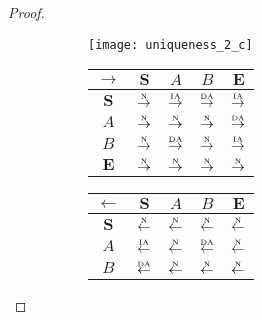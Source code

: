 \begin{proof}
\begin{figure}[htbp]
  \begin{subfigure}{1\textwidth}
    \vspace{1em}
    \centering
    \begin{minipage}[b]{1\textwidth}
      \centering
      \texttt{[image: uniqueness\_2\_c]}
    \end{minipage}
    \begin{minipage}[b]{0.3\textwidth}
      \vspace{1em}
      \centering
      \begin{tabular}{|c|c|c|c|c|} \hline
        $\rightarrow$ & $\bm{S}$ & $A$ & $B$ & $\bm{E}$\\ \hline
        $\bm{S}$ & $\overset{\text{\tiny{N}}}{\rightarrow}$ & $\overset{\text{\tiny{IA}}}{\rightarrow}$ & $\overset{\text{\tiny{DA}}}{\rightarrow}$ & $\overset{\text{\tiny{IA}}}{\rightarrow}$\\ \hline
        $A$ & $\overset{\text{\tiny{N}}}{\rightarrow}$ & $\overset{\text{\tiny{N}}}{\rightarrow}$ & $\overset{\text{\tiny{N}}}{\rightarrow}$ & $\overset{\text{\tiny{DA}}}{\rightarrow}$\\ \hline
        $B$ & $\overset{\text{\tiny{N}}}{\rightarrow}$ & $\overset{\text{\tiny{DA}}}{\rightarrow}$ & $\overset{\text{\tiny{N}}}{\rightarrow}$ & $\overset{\text{\tiny{IA}}}{\rightarrow}$\\ \hline
        $\bm{E}$ & $\overset{\text{\tiny{N}}}{\rightarrow}$ & $\overset{\text{\tiny{N}}}{\rightarrow}$ & $\overset{\text{\tiny{N}}}{\rightarrow}$ & $\overset{\text{\tiny{N}}}{\rightarrow}$\\ \hline
      \end{tabular}
    \end{minipage}
    \begin{minipage}[b]{0.3\textwidth}
      \vspace{1em}
      \centering
      \begin{tabular}{|c|c|c|c|c|} \hline
        $\leftarrow$ & $\bm{S}$ & $A$ & $B$ & $\bm{E}$\\ \hline
        $\bm{S}$ & $\overset{\text{\tiny{N}}}{\leftarrow}$ & $\overset{\text{\tiny{N}}}{\leftarrow}$ & $\overset{\text{\tiny{N}}}{\leftarrow}$ & $\overset{\text{\tiny{N}}}{\leftarrow}$\\ \hline
        $A$ & $\overset{\text{\tiny{IA}}}{\leftarrow}$ & $\overset{\text{\tiny{N}}}{\leftarrow}$ & $\overset{\text{\tiny{DA}}}{\leftarrow}$ & $\overset{\text{\tiny{N}}}{\leftarrow}$\\ \hline
        $B$ & $\overset{\text{\tiny{DA}}}{\leftarrow}$ & $\overset{\text{\tiny{N}}}{\leftarrow}$ & $\overset{\text{\tiny{N}}}{\leftarrow}$ & $\overset{\text{\tiny{N}}}{\leftarrow}$\\ \hline

\end{tabular}
\end{minipage}
\end{subfigure}
\end{figure}
\end{proof}
